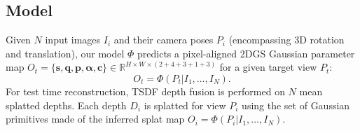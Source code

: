 

\subsection{Model}

Given $N$ input images $I_i$ and their camera poses $P_i$ (encompassing 3D rotation and translation), our model $\Phi$ predicts a pixel-aligned 2DGS Gaussian parameter map $O_t = \{\boldsymbol{s},\boldsymbol{q},\boldsymbol{p},\boldsymbol{\alpha},\boldsymbol{c}\} \in \mathbb{R}^{H\times W \times (2+4+3+1+3)}$ for a given target view $P_t$: 
\begin{equation}
O_t = \Phi(P_t|I_1,\ldots,I_N). 
\end{equation}
For test time reconstruction, TSDF depth fusion is performed on $N$  mean splatted depths. Each depth $D_i$ is splatted for view $P_i$ using the set of Gaussian primitives made of the inferred splat map $O_i=\Phi(P_i|I_1,\ldots,I_N)$. 

